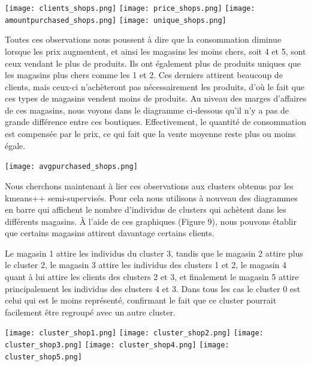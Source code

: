 \documentclass[12pt,a4paper]{book}
\newcommand{\1}{\mathds{1}}
\begin{document}
\noindent
\begin{center}
\texttt{[image: clients\_shops.png]}
\texttt{[image: price\_shops.png]}
\texttt{[image: amountpurchased\_shops.png]}
\texttt{[image: unique\_shops.png]}
\end{center}

\noindent
Toutes ces observations nous poussent à dire que la consommation diminue lorsque les prix augmentent, et ainsi les magasins les moins chers, soit 4 et 5, sont ceux vendant le plus de produits. Ils ont également plus de produits uniques que les magasins plus chers comme les 1 et 2. Ces derniers attirent beaucoup de clients, mais ceux-ci n'achèteront pas nécessairement les produits, d'où le fait que ces types de magasins vendent moins de produits. Au niveau des marges d'affaires de ces magasins, nous voyons dans le diagramme ci-dessous qu'il n'y a pas de grande différence entre ces boutiques. Effectivement, le quantité de consommation est compensée par le prix, ce qui fait que la vente moyenne reste plus ou moins égale.

\vspace{5 mm}
\begin{center}
\texttt{[image: avgpurchased\_shops.png]}
\end{center}

\noindent
Nous cherchons maintenant à lier ces observations aux clusters obtenus par les kmeans++ semi-supervisés. Pour cela nous utilisons à nouveau des diagrammes en barre qui affichent le nombre d'individus de clusters qui achètent dans les différents magasins. À l'aide de ces graphiques (Figure 9), nous pouvons établir que certains magasins attirent davantage certains clients.

\vspace{5 mm}
\noindent
Le magasin 1 attire les individus du cluster 3, tandis que le magasin 2 attire plus le cluster 2, le magasin 3 attire les individus des clusters 1 et 2, le magasin 4 quant à lui attire les clients des clusters 2 et 3, et finalement le magasin 5 attire principalement les individus des clusters 4 et 3. Dans tous les cas le cluster 0 est celui qui est le moins représenté, confirmant le fait que ce cluster pourrait facilement être regroupé avec un autre cluster.\\ 


\begin{center}
\texttt{[image: cluster\_shop1.png]}
\texttt{[image: cluster\_shop2.png]}
\texttt{[image: cluster\_shop3.png]}
\texttt{[image: cluster\_shop4.png]}
\texttt{[image: cluster\_shop5.png]}
\end{center}
\end{document}
